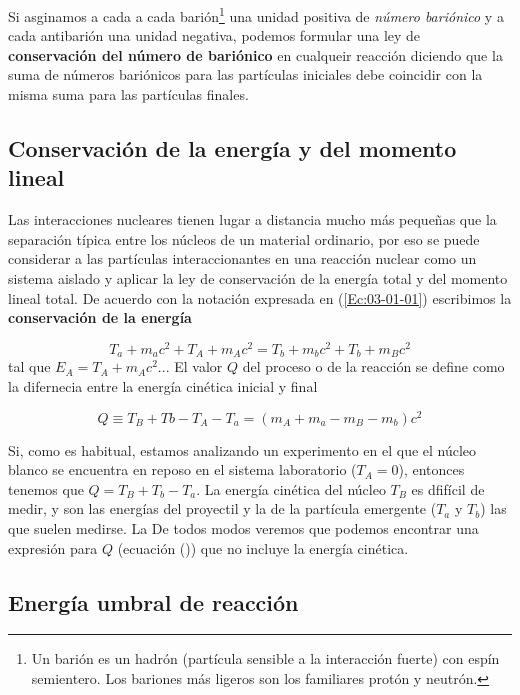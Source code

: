 Si asginamos a cada a cada barión\footnote{Un barión es un hadrón (partícula sensible a la interacción fuerte) con espín semientero. Los bariones más ligeros son los familiares protón y neutrón.} una unidad positiva de \textit{número bariónico} y a cada antibarión una unidad negativa, podemos formular una ley de \textbf{conservación del número de bariónico} en cualqueir reacción diciendo que la suma de números bariónicos para las partículas iniciales debe coincidir con la misma suma para las partículas finales.  %

\subsection{Conservación de la energía y del momento lineal}

Las interacciones nucleares tienen lugar a distancia mucho más pequeñas que la separación típica entre los núcleos de un material ordinario, por eso se puede considerar a las partículas interaccionantes en una reacción nuclear como un sistema aislado y aplicar la ley de conservación de la energía total y del momento lineal total. De acuerdo con la notación expresada en (\ref{Ec:03-01-01}) escribimos la \textbf{conservación de la energía}

\begin{equation}
    T_a + m_a c^2 +T_A+m_A c^2 = T_b +m_bc^2 + T_b + m_Bc^2
\end{equation}
tal que $E_A = T_A + m_Ac^2$... El valor $Q$ del proceso o de la reacción se define como la difernecia entre la energía cinética inicial y final 

\begin{equation}
    Q \equiv T_B + Tb - T_A - T_a = (m_A + m_a - m_B - m_b) c^2
\end{equation}

Si, como es habitual, estamos analizando un experimento en el que el núcleo blanco se encuentra en reposo en el sistema laboratorio ($T_A=0$), entonces tenemos que $Q = T_B + T_b - T_a$. La energía cinética del núcleo $T_B$ es dfifícil de medir, y son las energías del proyectil y la de la partícula emergente ($T_a$ y $T_b$) las que suelen medirse. La De todos modos veremos que podemos encontrar una expresión para $Q$ (ecuación ())  que no incluye la energía cinética.



\subsection{Energía umbral de reacción}

